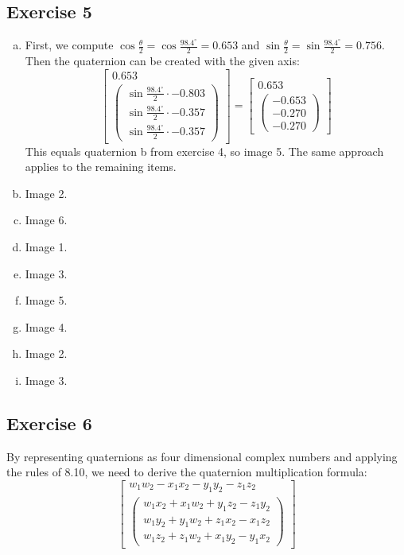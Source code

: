 \documentclass[11pt]{article}
\begin{document}
\subsection{Exercise 5}

\begin{enumerate}[a.]
	\item %
		First, we compute $\cos\frac{\theta}{2}=\cos\frac{98.4^\circ}{2}=0.653$ and $\sin\frac{\theta}{2}=\sin\frac{98.4^\circ}{2}=0.756$. Then the quaternion can be created with the given axis: 
		$$\begin{bmatrix}
			0.653 \\
			\begin{pmatrix}
				\sin\frac{98.4^\circ}{2}\cdot -0.803 \\
				\sin\frac{98.4^\circ}{2}\cdot -0.357 \\
				\sin\frac{98.4^\circ}{2}\cdot -0.357
			\end{pmatrix}
		\end{bmatrix}=\begin{bmatrix}
			0.653 \\
			\begin{pmatrix}
				-0.653 \\
				-0.270 \\
				-0.270
			\end{pmatrix}
		\end{bmatrix}$$
		This equals quaternion b from exercise 4, so image 5. The same approach applies to the remaining items.
	\item %
	Image 2.
	\item %
	Image 6.
	\item %
	Image 1.
	\item %
	Image 3.
	\item %
	Image 5.
	\item %
	Image 4.
	\item %
	Image 2.
	\item %
	Image 3.
\end{enumerate}

\subsection{Exercise 6}

By representing quaternions as four dimensional complex numbers and applying the rules of 8.10, we need to derive the quaternion multiplication formula: $$\begin{bmatrix}
	w_1w_2-x_1x_2-y_1y_2-z_1z_2 \\
	\begin{pmatrix}
		w_1x_2 + x_1w_2 + y_1z_2 - z_1y_2 \\
		w_1y_2 + y_1w_2 + z_1x_2 - x_1z_2 \\
		w_1z_2 + z_1w_2 + x_1y_2 - y_1x_2
	\end{pmatrix}
\end{bmatrix}$$
\end{document}
